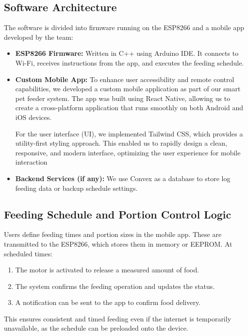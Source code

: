 \documentclass[10pt,a4paper]{extarticle}
\begin{document}
\subsection{Software Architecture}
The software is divided into firmware running on the ESP8266 and a mobile app developed by the team:
\begin{itemize}
    \item \textbf{ESP8266 Firmware:} Written in C++ using Arduino IDE. It connects to Wi-Fi, receives instructions from the app, and executes the feeding schedule.
    \item \textbf{Custom Mobile App:} To enhance user accessibility and remote control capabilities, we developed a custom mobile application as part of our smart pet feeder system. The app was built using React Native, allowing us to create a cross-platform application that runs smoothly on both Android and iOS devices.

For the user interface (UI), we implemented Tailwind CSS, which provides a utility-first styling approach. This enabled us to rapidly design a clean, responsive, and modern interface, optimizing the user experience for mobile interaction
    \item \textbf{Backend Services (if any):} We use Convex as a  database to store log feeding data or backup schedule settings.
\end{itemize}

\subsection{Feeding Schedule and Portion Control Logic}

Users define feeding times and portion sizes in the mobile app. These are transmitted to the ESP8266, which stores them in memory or EEPROM. At scheduled times:

\vspace{-0.5\baselineskip}
\begin{enumerate}[parsep=0em]
    \item The motor is activated to release a measured amount of food.
    \item The system confirms the feeding operation and updates the status.
    \item A notification can be sent to the app to confirm food delivery.
\end{enumerate}

This ensures consistent and timed feeding even if the internet is temporarily unavailable, as the schedule can be preloaded onto the device.
\end{document}
